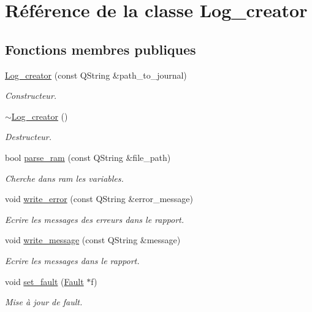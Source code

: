 \hypertarget{classLog__creator}{
\section{Référence de la classe Log\_\-creator}
\label{classLog__creator}
}
\subsection*{Fonctions membres publiques}
\begin{DoxyCompactItemize}
\item 
\hyperlink{classLog__creator_a9b41865df79c41c8924597575919eb10}{Log\_\-creator} (const QString \&path\_\-to\_\-journal)
\begin{DoxyCompactList}\small\item\em Constructeur. \item\end{DoxyCompactList}\item 
\hypertarget{classLog__creator_af63167b0de7f559c4c67430662ae2b45}{
\hyperlink{classLog__creator_af63167b0de7f559c4c67430662ae2b45}{$\sim$Log\_\-creator} ()}
\label{classLog__creator_af63167b0de7f559c4c67430662ae2b45}

\begin{DoxyCompactList}\small\item\em Destructeur. \item\end{DoxyCompactList}\item 
bool \hyperlink{classLog__creator_a452a9ccc31cb82783cd70cc6a8e6b68f}{parse\_\-ram} (const QString \&file\_\-path)
\begin{DoxyCompactList}\small\item\em Cherche dans ram les variables. \item\end{DoxyCompactList}\item 
void \hyperlink{classLog__creator_a6bbc059eb7b6825439f31f00d182f8b1}{write\_\-error} (const QString \&error\_\-message)
\begin{DoxyCompactList}\small\item\em Ecrire les messages des erreurs dans le rapport. \item\end{DoxyCompactList}\item 
void \hyperlink{classLog__creator_a347fe83a5cd3535f5065649a16bd9ab6}{write\_\-message} (const QString \&message)
\begin{DoxyCompactList}\small\item\em Ecrire les messages dans le rapport. \item\end{DoxyCompactList}\item 
void \hyperlink{classLog__creator_ae12b4c588f3c5d69182e9c0433f23376}{set\_\-fault} (\hyperlink{classFault}{Fault} $\ast$f)
\begin{DoxyCompactList}\small\item\em Mise à jour de fault. \item\end{DoxyCompactList}\end{DoxyCompactItemize}


